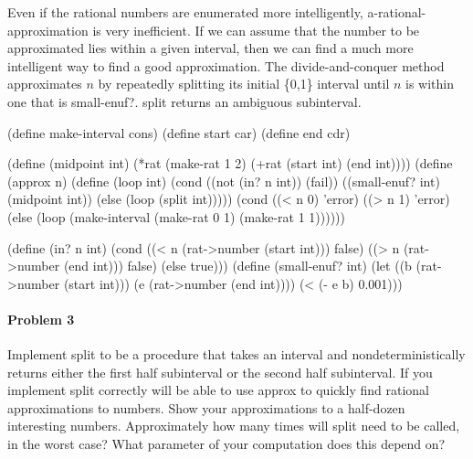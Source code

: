 Even if the rational numbers are enumerated more intelligently, 
{\cf a-rational-approximation} is very inefficient.
If we can assume that the number to be approximated lies within a given
interval, then we can find a much more intelligent way to
find a good approximation.  The divide-and-conquer method approximates $n$
by repeatedly splitting its initial
\{0,1\} interval until $n$ is within one that is {\cf small-enuf?}.  {\cf
split} returns an ambiguous subinterval.

\beginlisp
(define make-interval cons)
\null
(define start car)
\null
(define end cdr)
\endlisp

\beginlisp
(define (midpoint int)
  (*rat (make-rat 1 2)
        (+rat (start int) (end int))))
\null
(define (approx n)
  (define (loop int)
    (cond ((not (in? n int)) (fail))
          ((small-enuf? int) (midpoint int))
          (else (loop (split int)))))
  (cond ((< n 0) 'error)
        ((> n 1) 'error)
        (else (loop (make-interval (make-rat 0 1) (make-rat 1 1))))))
\endlisp

\beginlisp
(define (in? n int)
  (cond ((< n (rat->number (start int))) false)
        ((> n (rat->number (end int))) false)
        (else true)))
\null
(define (small-enuf? int)
  (let ((b (rat->number (start int)))
        (e (rat->number (end int))))
    (< (- e b) 0.001)))
\endlisp

\paragraph{Problem 3}

Implement {\cf split} to be a procedure that takes an interval and
nondeterministically returns either the first half subinterval or the
second half subinterval.  If you implement {\cf split} correctly will
be able to use {\cf approx} to quickly find rational approximations to
numbers.  Show your approximations to a half-dozen interesting
numbers.  Approximately how many times will {\cf split} need to be
called, in the worst case?  What parameter of your computation does
this depend on?
